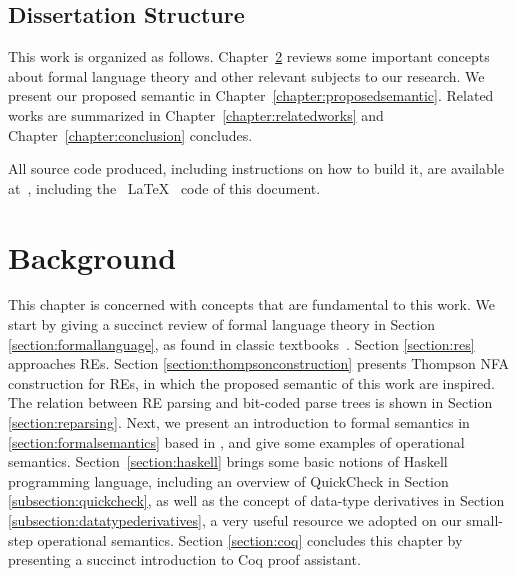 \documentclass[oneside,12pt]{scrbook}
\theoremstyle{definition}
\theoremstyle{plain}
\theoremstyle{definition}
\begin{document}
\section{Dissertation Structure}\label{section:structure}

This work is organized as follows. Chapter~\ref{chapter:background} reviews some important concepts about
formal language theory and other relevant subjects to our research. We present our proposed semantic in Chapter~\ref{chapter:proposedsemantic}. Related works are summarized in Chapter~\ref{chapter:relatedworks} and Chapter~\ref{chapter:conclusion} concludes.

All source code produced, including instructions on how to build it, are available at~\cite{regexvm-rep}, including the ~\LaTeX~ code of this document.





\chapter{Background}\label{chapter:background}

This chapter is concerned with concepts that are fundamental to this work. We start by giving a succinct
review of formal language theory in Section \ref{section:formallanguage}, as found in classic textbooks~\cite{Hopcroft2000}. Section \ref{section:res} approaches REs.  Section \ref{section:thompsonconstruction} presents Thompson NFA construction for REs, in which the proposed semantic of this work are inspired. The relation between RE parsing and bit-coded parse trees is shown in Section \ref{section:reparsing}. Next, we present an introduction to
formal semantics in \ref{section:formalsemantics} based in \cite{Pierce2000}, and give some examples of operational
semantics. Section~\ref{section:haskell} brings some basic notions of Haskell programming language, including an overview of QuickCheck in Section \ref{subsection:quickcheck}, as well as the concept of data-type derivatives in Section \ref{subsection:datatypederivatives}, a very useful resource we adopted on our small-step operational semantics. Section \ref{section:coq} concludes this chapter by presenting a succinct introduction to Coq proof assistant.
\end{document}

